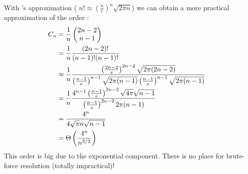 With 's approximation (
$n! \approx \left(\frac{n}{e}\right)^n \sqrt{2\pi n}$) we can obtain a more practical approximation of the order : 
\begin{align*}
C_n &= \frac{1}{n}\left( \begin{matrix} 2n-2\\ n-1\end{matrix} \right)\\
&= \frac{1}{n} \frac{(2n-2)!}{(n-1)!(n-1)!}\\
&\approx \frac{1}{n} \frac{\left(\frac{2n-2}{e}\right)^{2n-2} \sqrt{2\pi (2n-2)}}{\left(\frac{n-1}{e}\right)^{n-1} \sqrt{2\pi (n-1)}\left(\frac{n-1}{e}\right)^{n-1} \sqrt{2\pi (n-1)}}\\
&=\frac{1}{n} \frac{4^{n-1}\left(\frac{n-1}{e}\right)^{2n-2}\sqrt{4\pi}\sqrt{n-1}}{\left(\frac{n-1}{e}\right)^{2n-2}2\pi (n-1)}\\
&=\frac{4^n}{4\sqrt{\pi} n\sqrt{n-1}}\\
&= \Theta \left(\frac{4^n}{n^{3/2}}\right)
\end{align*}
This order is big due to the exponential component. There is no place for brute-force resolution (totally impractical)!